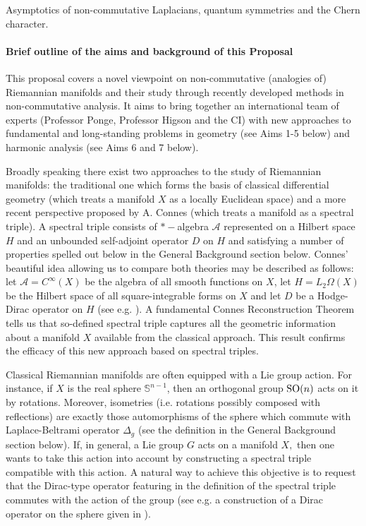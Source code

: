 \documentclass[12pt]{article}
\newcommand{\archeading}[1]{\vspace{.3cm} \noindent{\bfseries #1} \vspace{.1cm}   }
\begin{document}
\parindent=20pt
\pagestyle{empty}
\newpage

\archeading{Project Title} Asymptotics of non-commutative Laplacians, quantum symmetries and the Chern character.

\bigskip\archeading{Aims and Background}


\paragraph*{Brief outline of the aims and background of this Proposal} 

This proposal covers a novel viewpoint on non-commutative (analogies of) Riemannian manifolds and their study through recently developed methods in non-commutative analysis. It aims to bring together an international team of experts (Professor Ponge, Professor Higson and the CI) with new approaches to fundamental and long-standing problems in geometry (see Aims 1-5 below) and harmonic analysis (see Aims 6 and 7 below).

Broadly speaking there exist two approaches to the study of Riemannian manifolds: the  traditional one which forms the basis of classical differential geometry (which treats a manifold $X$ as a locally Euclidean space) and a more recent perspective proposed by A. Connes (which treats a manifold as a spectral triple). A spectral triple consists of $\ast-$algebra $\mathcal{A}$ represented on a Hilbert space $H$ and an unbounded self-adjoint operator $D$ on $H$ and satisfying a number of properties spelled out below in the General Background section below. Connes' beautiful idea \cite{Connes-book} allowing us to compare both theories may be described as follows: let  $\mathcal{A}=C^{\infty}(X)$ be the algebra of all smooth functions on $X$, let $H=L_2\Omega(X)$ be the Hilbert space of all square-integrable forms on $X$ and let $D$ be a Hodge-Dirac operator on $H$ (see e.g. \cite{BGV}). A fundamental Connes Reconstruction Theorem \cite{Connes-reconstruction} tells us that so-defined spectral triple captures all the geometric information about a manifold $X$ available from the classical approach. This result confirms the efficacy of this new approach based on spectral triples.

Classical Riemannian manifolds are often equipped with a Lie group action. For instance, if $X$ is the real sphere $\mathbb{S}^{n-1}$, then an orthogonal group ${\rm SO}(n)$ acts on it by rotations. Moreover, isometries (i.e. rotations possibly composed with reflections) are exactly those automorphisms of the sphere which commute with Laplace-Beltrami operator $\Delta_g$ (see the definition in the General Background section below). If, in general, a Lie group $G$ acts on a manifold $X,$ then one wants to take this action into account by constructing a spectral triple compatible with this action. A natural way to achieve this objective is to request that the Dirac-type operator featuring in the definition of the spectral triple commutes with the action of the group (see e.g. a construction of a Dirac operator on the sphere given in \cite{GVF}). 
\end{document}
